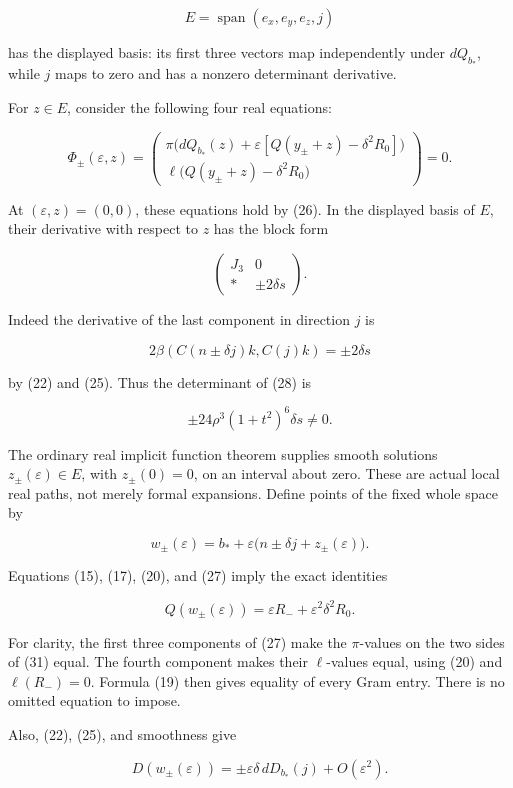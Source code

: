 \documentclass[11pt]{article}
\begin{document}
\[
E=\operatorname{span}(e_x,e_y,e_z,j)
\]

has the displayed basis: its first three vectors map independently under
\(dQ_{b_*}\), while \(j\) maps to zero and has a nonzero determinant
derivative.

For \(z\in E\), consider the following four real equations:

\[
\Phi_\pm(\varepsilon,z)=
\begin{pmatrix}
\pi\bigl(dQ_{b_*}(z)+\varepsilon[Q(y_\pm+z)-\delta^2R_0]\bigr)\\
\ell\bigl(Q(y_\pm+z)-\delta^2R_0\bigr)
\end{pmatrix}=0.
\tag{27}
\]

At \((\varepsilon,z)=(0,0)\), these equations hold by (26). In the displayed
basis of \(E\), their derivative with respect to \(z\) has the block form

\[
\begin{pmatrix}
J_3&0\\
*&\pm2\delta s
\end{pmatrix}.
\tag{28}
\]

Indeed the derivative of the last component in direction \(j\) is

\[
2\beta(C(n\pm\delta j)k,C(j)k)=\pm2\delta s
\]

by (22) and (25). Thus the determinant of (28) is

\[
\pm24\rho^3(1+t^2)^6\delta s\ne0.
\tag{29}
\]

The ordinary real implicit function theorem supplies smooth solutions
\(z_\pm(\varepsilon)\in E\), with \(z_\pm(0)=0\), on an interval about
zero. These are actual local real paths, not merely formal expansions.
Define points of the fixed whole space by

\[
w_\pm(\varepsilon)=b_*+
\varepsilon\bigl(n\pm\delta j+z_\pm(\varepsilon)\bigr).
\tag{30}
\]

Equations (15), (17), (20), and (27) imply the exact identities

\[
Q(w_\pm(\varepsilon))
 =\varepsilon R_-+\varepsilon^2\delta^2R_0.
\tag{31}
\]

For clarity, the first three components of (27) make the \(\pi\)-values on
the two sides of (31) equal. The fourth component makes their \(\ell\)-values
equal, using (20) and \(\ell(R_-)=0\). Formula (19) then gives equality of
every Gram entry. There is no omitted equation to impose.

Also, (22), (25), and smoothness give

\[
D(w_\pm(\varepsilon))
 =\pm\varepsilon\delta\,dD_{b_*}(j)+O(\varepsilon^2).
\tag{32}
\]
\end{document}
